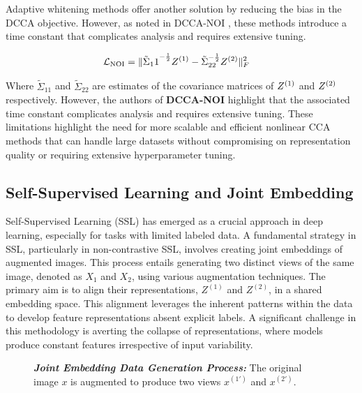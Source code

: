 Adaptive whitening methods \citep{wang2015stochastic, chang2018scalable} offer another solution by reducing the bias in the DCCA objective.
However, as noted in DCCA-NOI \citep{wang2015unsupervised}, these methods introduce a time constant that complicates analysis and requires extensive tuning.

\begin{align}
    \mathcal{L}_\text{NOI} &= \|{\tilde{\Sigma}_11}^{-\frac{1}{2}} Z^{(1)}-{\tilde{\Sigma}_{22}}^{-\frac{1}{2}} Z^{(2)}\|^2_F
\end{align}

Where $\tilde{\Sigma}_{11}$ and $\tilde{\Sigma}_{22}$ are estimates of the covariance matrices of $Z^{(1)}$ and $Z^{(2)}$ respectively.
However, the authors of \textbf{DCCA-NOI} highlight that the associated time constant complicates analysis and requires extensive tuning.
These limitations highlight the need for more scalable and efficient nonlinear CCA methods that can handle large datasets without compromising on representation quality or requiring extensive hyperparameter tuning.
\subsection{Self-Supervised Learning and Joint Embedding}

Self-Supervised Learning (SSL) has emerged as a crucial approach in deep learning, especially for tasks with limited labeled data. A fundamental strategy in SSL, particularly in non-contrastive SSL, involves creating joint embeddings of augmented images. This process entails generating two distinct views of the same image, denoted as \( X_1 \) and \( X_2 \), using various augmentation techniques. The primary aim is to align their representations, \( Z^{(1)} \) and \( Z^{(2)} \), in a shared embedding space. This alignment leverages the inherent patterns within the data to develop feature representations absent explicit labels. A significant challenge in this methodology is averting the collapse of representations, where models produce constant features irrespective of input variability.

\begin{figure}[ht]
    \centering
    \caption[Joint Embedding Data Generation Process]{\textit{\textbf{Joint Embedding Data Generation Process:}} The original image \(x\) is augmented to produce two views \(x^{(1')}\) and \(x^{(2')}\).}
    \label{fig:joint-embedding}
\end{figure}

